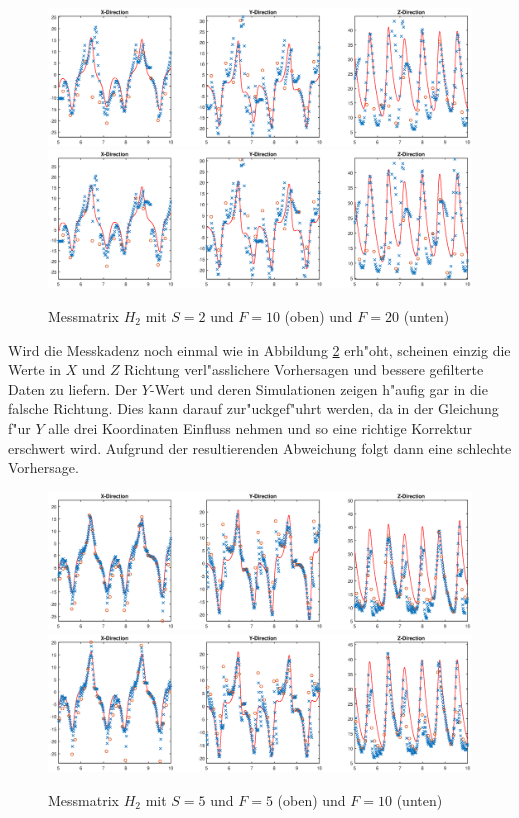 \begin{refsection}
\begin{figure}
\centering
\includegraphics[width=\hsize]{kalman/figures/H2R10S2.eps}
\includegraphics[width=\hsize]{kalman/figures/H2R20S2.eps}
\caption{Messmatrix $H_{2}$ mit $S=2$ und $F=10$ (oben) und $F=20$ (unten)}
\label{kalman:H2S2}
\end{figure}

Wird die Messkadenz noch einmal wie in Abbildung \ref{kalman:H2S5} erh"oht, scheinen einzig die Werte in $X$ und $Z$ Richtung verl"asslichere Vorhersagen und bessere gefilterte Daten zu liefern. Der $Y$-Wert und deren Simulationen zeigen h"aufig gar in die falsche Richtung. Dies kann darauf zur"uckgef"uhrt werden, da in der Gleichung f"ur $Y$ alle drei Koordinaten Einfluss nehmen und so eine richtige Korrektur erschwert wird. Aufgrund der resultierenden Abweichung folgt dann eine schlechte Vorhersage.

\begin{figure}
\centering
\includegraphics[width=\hsize]{kalman/figures/H2R05S5.eps}
\includegraphics[width=\hsize]{kalman/figures/H2R10S5.eps}
\caption{Messmatrix $H_{2}$ mit $S=5$ und $F=5$ (oben) und $F=10$ (unten)}
\label{kalman:H2S5}
\end{figure}


\end{refsection}
